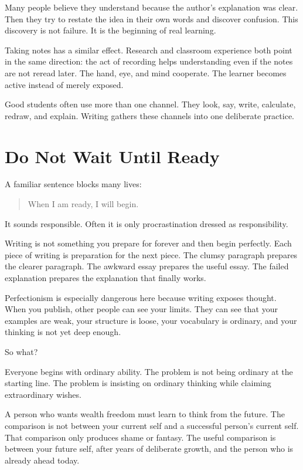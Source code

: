 Many people believe they understand because the author's explanation was clear. Then they try to restate the idea in their own words and discover confusion. This discovery is not failure. It is the beginning of real learning.

Taking notes has a similar effect. Research and classroom experience both point in the same direction: the act of recording helps understanding even if the notes are not reread later. The hand, eye, and mind cooperate. The learner becomes active instead of merely exposed.

Good students often use more than one channel. They look, say, write, calculate, redraw, and explain. Writing gathers these channels into one deliberate practice.

\section*{Do Not Wait Until Ready}

A familiar sentence blocks many lives:

\begin{quote}
When I am ready, I will begin.
\end{quote}

It sounds responsible. Often it is only procrastination dressed as responsibility.

Writing is not something you prepare for forever and then begin perfectly. Each piece of writing is preparation for the next piece. The clumsy paragraph prepares the clearer paragraph. The awkward essay prepares the useful essay. The failed explanation prepares the explanation that finally works.

Perfectionism is especially dangerous here because writing exposes thought. When you publish, other people can see your limits. They can see that your examples are weak, your structure is loose, your vocabulary is ordinary, and your thinking is not yet deep enough.

So what?

Everyone begins with ordinary ability. The problem is not being ordinary at the starting line. The problem is insisting on ordinary thinking while claiming extraordinary wishes.

A person who wants wealth freedom must learn to think from the future. The comparison is not between your current self and a successful person's current self. That comparison only produces shame or fantasy. The useful comparison is between your future self, after years of deliberate growth, and the person who is already ahead today.

